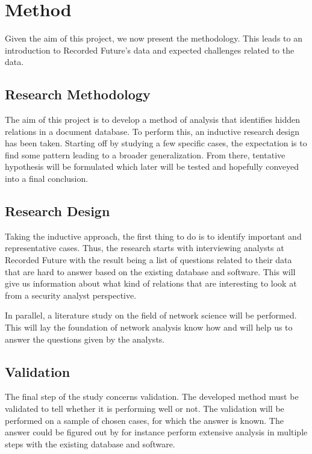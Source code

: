 \chapter{Method}
Given the aim of this project, we now present the methodology. This leads to an introduction to Recorded Future's data and expected challenges related to the data.

\section{Research Methodology}
The aim of this project is to develop a method of analysis that identifies hidden relations in a document database. To perform this, an inductive research design has been taken. Starting off by studying a few specific cases, the expectation is to find some pattern leading to a broader generalization. From there, tentative hypothesis will be formulated which later will be tested and hopefully conveyed into a final conclusion.

\section{Research Design}
Taking the inductive approach, the first thing to do is to identify important and representative cases. Thus, the research starts with interviewing analysts at Recorded Future with the result being a list of questions related to their data that are hard to answer based on the existing database and software. This will give us information about what kind of relations that are interesting to look at from a security analyst perspective.

In parallel, a literature study on the field of network science will be performed. This will lay the foundation of network analysis know how and will help us to answer the questions given by the analysts. 

\section{Validation} 
The final step of the study concerns validation. The developed method must be validated to tell whether it is performing well or not. The validation will be performed on a sample of chosen cases, for which the answer is known. The answer could be figured out by for instance perform extensive analysis in multiple steps with the existing database and software.

